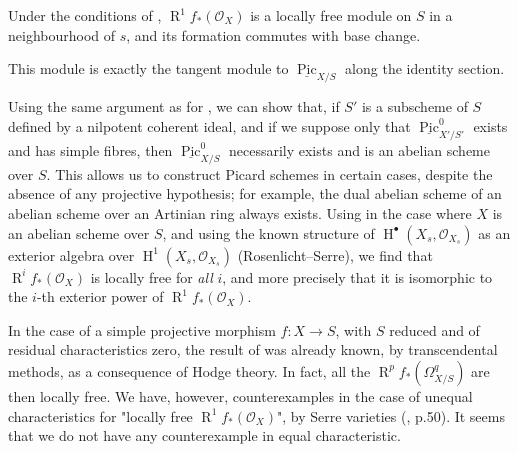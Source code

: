 \begin{corollary}\label{fga3.vi-3-corollary-3.6}
    Under the conditions of , $\operatorname{R}^1 f_*(\mathcal{O}_X)$ is a locally free module on $S$ in a neighbourhood of $s$, and its formation commutes with base change.
\end{corollary}

\begin{cproof}
    This module is exactly the tangent module to $\underline{\operatorname{Pic}}_{X/S}$ along the identity section.
\end{cproof}

\begin{remark}\label{fga3.vi-3-remark-3.7}
    Using the same argument as for , we can show that, if $S'$ is a subscheme of $S$ defined by a nilpotent coherent ideal, and if we suppose only that $\underline{\operatorname{Pic}}_{X'/S'}^0$ exists and has simple fibres, then $\underline{\operatorname{Pic}}_{X/S}^0$ necessarily exists and is an abelian scheme over $S$.
    This allows us to construct Picard schemes in certain cases, despite the absence of any projective hypothesis;
    for example, the dual abelian scheme of an abelian scheme over an Artinian ring always exists.
    Using  in the case where $X$ is an abelian scheme over $S$, and using the known structure of $\operatorname{H}^\bullet(X_s,\mathcal{O}_{X_s})$ as an exterior algebra over $\operatorname{H}^1(X_s,\mathcal{O}_{X_s})$ (Rosenlicht–Serre), we find that $\operatorname{R}^if_*(\mathcal{O}_X)$ is locally free for \emph{all} $i$, and more precisely that it is isomorphic to the $i$-th exterior power of $\operatorname{R}^1f_*(\mathcal{O}_X)$.
\end{remark}

\begin{remark}\label{fga3.vi-3-remark-3.8}
    In the case of a simple projective morphism $f\colon X\to S$, with $S$ reduced and of residual characteristics zero, the result of  was already known, by transcendental methods, as a consequence of Hodge theory.
    In fact, all the $\operatorname{R}^pf_*(\Omega_{X/S}^q)$ are then locally free.
    We have, however, counterexamples in the case of unequal characteristics for "locally free $\operatorname{R}^1f_*(\mathcal{O}_X)$", by Serre varieties (\cite{Ser1958b}, p.50).
    It seems that we do not have any counterexample in equal characteristic.
\end{remark}

